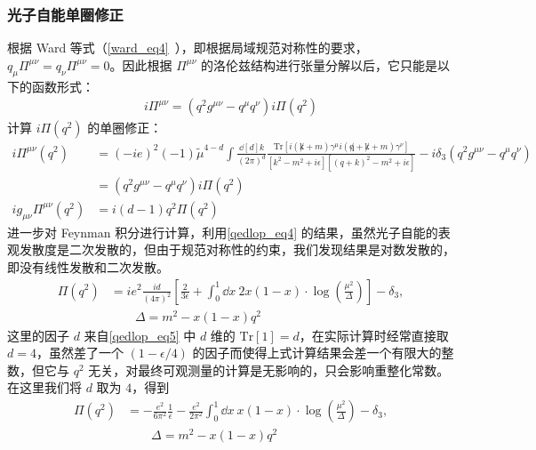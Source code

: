 \subsubsection{光子自能单圈修正}
根据 Ward 等式（\autoref{ward_eq4}~），即根据局域规范对称性的要求，$q_\mu\Pi^{\mu\nu}=q_\nu \Pi^{\mu\nu}=0$。因此根据 $\Pi^{\mu\nu}$ 的洛伦兹结构进行张量分解以后，它只能是以下的函数形式：
\begin{equation}
\begin{aligned}
i\Pi^{\mu\nu}=(q^2g^{\mu\nu}-q^\mu q^\nu)i\Pi(q^2)
\end{aligned}
\end{equation}
计算 $i\Pi(q^2)$ 的单圈修正：
\begin{equation}
\begin{aligned}
i\Pi^{\mu\nu}(q^2)&=(-ie)^2 (-1) \tilde{\mu}^{4-d}\int\frac{\dd[d]{k}}{(2\pi)^d} \frac{\text{Tr}[i(\not k+m)\gamma^\mu i(\not q+\not k+m)\gamma^\nu]}{[k^2-m^2+i\epsilon][(q+k)^2-m^2+i\epsilon]}-i\delta_3 (q^2 g^{\mu\nu}-q^\mu q^\nu)\\
&=(q^2g^{\mu\nu}-q^\mu q^\nu)i\Pi(q^2)\\
i g_{\mu\nu}\Pi^{\mu\nu}(q^2) &= i (d-1) q^2 \Pi(q^2)
\end{aligned}
\end{equation}
进一步对 Feynman 积分进行计算，利用\autoref{qedlop_eq4} 的结果，虽然光子自能的表观发散度是二次发散的，但由于规范对称性的约束，我们发现结果是对数发散的，即没有线性发散和二次发散。
\begin{equation}
\begin{aligned}
\Pi(q^2)&=i e^2 \frac{id}{(4\pi)^2}\left[\frac{2}{3\epsilon}+\int_0^1 \dd x\ 2x(1-x)\cdot\log\left(\frac{\mu^2}{\Delta}\right)\right] - \delta_3,\\
&\quad\quad \Delta = m^2-x(1-x)q^2
\end{aligned}
\end{equation}
这里的因子 $d$ 来自\autoref{qedlop_eq5} 中 $d$ 维的 $\text{Tr}[1]=d$，在实际计算时经常直接取 $d=4$，虽然差了一个 $(1-\epsilon/4)$ 的因子而使得上式计算结果会差一个有限大的整数，但它与 $q^2$ 无关，对最终可观测量的计算是无影响的，只会影响重整化常数。在这里我们将 $d$ 取为 $4$，得到
\begin{equation}
\begin{aligned}
\Pi(q^2)&=-\frac{e^2}{6\pi^2}\frac{1}{\epsilon}-\frac{e^2}{2\pi^2}\int_0^1 \dd x\ x(1-x)\cdot\log\left(\frac{\mu^2}{\Delta}\right) - \delta_3,\\
&\quad\quad \Delta = m^2-x(1-x)q^2
\end{aligned}
\end{equation}



